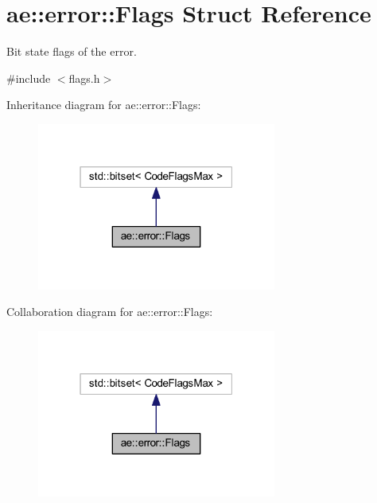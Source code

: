 \hypertarget{structae_1_1error_1_1_flags}{}\section{ae\+:\+:error\+:\+:Flags Struct Reference}
\label{structae_1_1error_1_1_flags}


Bit state flags of the error.  




{\ttfamily \#include $<$flags.\+h$>$}



Inheritance diagram for ae\+:\+:error\+:\+:Flags\+:
\nopagebreak
\begin{figure}[H]
\begin{center}
\leavevmode
\includegraphics[width=223pt]{structae_1_1error_1_1_flags__inherit__graph}
\end{center}
\end{figure}


Collaboration diagram for ae\+:\+:error\+:\+:Flags\+:
\nopagebreak
\begin{figure}[H]
\begin{center}
\leavevmode
\includegraphics[width=223pt]{structae_1_1error_1_1_flags__coll__graph}
\end{center}
\end{figure}
